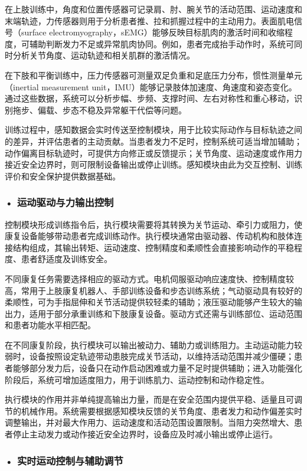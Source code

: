 在上肢训练中，角度和位置传感器可记录肩、肘、腕关节的活动范围、运动速度和末端轨迹，力传感器则用于分析患者推、拉和抓握过程中的主动用力。表面肌电信号（surface electromyography，sEMG）能够反映目标肌肉的激活时间和收缩程度，可辅助判断发力不足或异常肌肉协同。例如，患者完成抬手动作时，系统可同时分析关节角度、运动轨迹和相关肌群的激活情况。

在下肢和平衡训练中，压力传感器可测量双足负重和足底压力分布，惯性测量单元（inertial measurement unit，IMU）能够记录肢体加速度、角速度和姿态变化。通过这些数据，系统可以分析步幅、步频、支撑时间、左右对称性和重心移动，识别拖步、偏载、步态不稳及异常躯干代偿等问题。

训练过程中，感知数据会实时传送至控制模块，用于比较实际动作与目标轨迹之间的差异，并评估患者的主动贡献。当患者发力不足时，控制系统可适当增加辅助；动作偏离目标轨迹时，可提供方向修正或反馈提示；关节角度、运动速度或作用力接近安全边界时，则可限制设备输出或停止训练。感知模块由此为交互控制、训练评价和安全保护提供数据基础。

\subsubsection*{\textbf{• 运动驱动与力输出控制}}

控制模块形成训练指令后，执行模块需要将其转换为关节运动、牵引力或阻力，使康复设备能够带动患者完成训练动作。执行模块通常由驱动器、传动机构和肢体连接结构组成，其输出转矩、运动速度、控制精度和柔顺性会直接影响动作的平稳程度、患者舒适度及训练安全。

不同康复任务需要选择相应的驱动方式。电机伺服驱动响应速度快、控制精度较高，常用于上肢康复机器人、手部训练设备和步态训练系统；气动驱动具有较好的柔顺性，可为手指屈伸和关节活动提供较轻柔的辅助；液压驱动能够产生较大的输出力，适用于部分承重训练和下肢康复设备。驱动方式还需与训练部位、运动范围和患者功能水平相匹配。

在不同康复阶段，执行模块可以输出被动力、辅助力或训练阻力。主动运动能力较弱时，设备按照设定轨迹带动患肢完成关节活动，以维持活动范围并减少僵硬；患者能够部分发力后，设备只在动作启动困难或力量不足时提供辅助；进入功能强化阶段后，系统可增加适度阻力，用于训练肌力、运动控制和动作稳定性。

执行模块的作用并非单纯提高输出力量，而是在安全范围内提供平稳、适量且可调节的机械作用。系统需要根据感知模块反馈的关节角度、患者发力和动作偏差实时调整输出，并对最大作用力、运动速度和活动范围设置限制。当阻力突然增大、患者停止主动发力或动作接近安全边界时，设备应及时减小输出或停止运行。


\subsubsection*{\textbf{• 实时运动控制与辅助调节}}


